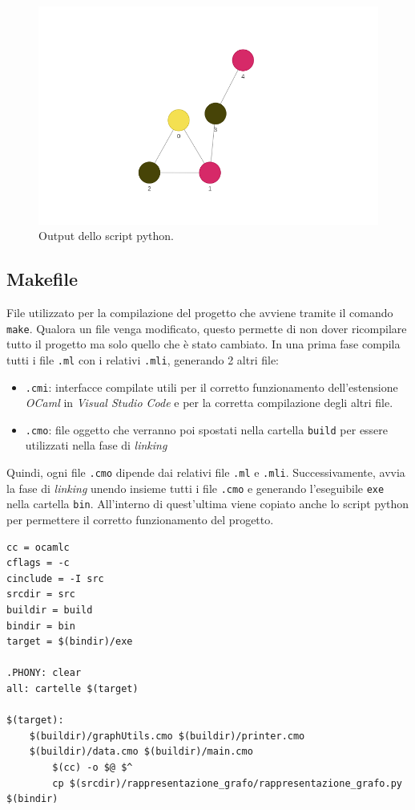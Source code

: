 \begin{figure}[H]
	\centering
	\includegraphics[width=.6\textwidth]{img/grafocoloratopy.png}
	\caption{Output dello script python.}
\end{figure}

\subsection{Makefile}

File utilizzato per la compilazione del progetto che avviene tramite il comando \lstinline[style=cmd]|make|. 
Qualora un file venga modificato, questo permette di non dover ricompilare tutto il progetto ma solo quello che è stato cambiato. In una prima fase compila tutti i file \lstinline[style=cmd]|.ml| con i relativi \lstinline[style=cmd]|.mli|, generando 2 altri file:

\begin{itemize}
	\item \lstinline[style=cmd]|.cmi|: interfacce compilate utili per il corretto funzionamento dell'estensione \textit{OCaml} in \textit{Visual Studio Code} e per la corretta compilazione degli altri file.
	\item \lstinline[style=cmd]|.cmo|: file oggetto che verranno poi spostati nella cartella \lstinline[style=cmd]|build| per essere utilizzati nella fase di \textit{linking}
\end{itemize}

Quindi, ogni file \lstinline[style=cmd]|.cmo| dipende dai relativi file \lstinline[style=cmd]|.ml| e \lstinline[style=cmd]|.mli|.
Successivamente, avvia la fase di \textit{linking} unendo insieme tutti i file \lstinline[style=cmd]|.cmo| e generando l'eseguibile \lstinline[style=cmd]|exe| nella cartella \lstinline[style=cmd]|bin|. All’interno di quest’ultima viene copiato anche lo script python per permettere il corretto funzionamento del progetto.\\

\begin{lstlisting}[style=make, caption={Breve estratto del file Makefile}]
cc = ocamlc
cflags = -c
cinclude = -I src
srcdir = src
buildir = build
bindir = bin
target = $(bindir)/exe

.PHONY: clear
all: cartelle $(target)

$(target): 
	$(buildir)/graphUtils.cmo $(buildir)/printer.cmo 
	$(buildir)/data.cmo $(buildir)/main.cmo
		$(cc) -o $@ $^
		cp $(srcdir)/rappresentazione_grafo/rappresentazione_grafo.py $(bindir)

\end{lstlisting}

